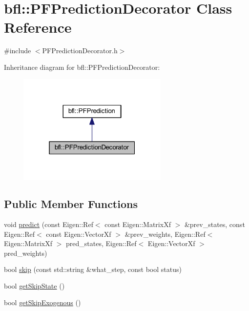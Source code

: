 \hypertarget{classbfl_1_1PFPredictionDecorator}{}\section{bfl\+:\+:P\+F\+Prediction\+Decorator Class Reference}
\label{classbfl_1_1PFPredictionDecorator}


{\ttfamily \#include $<$P\+F\+Prediction\+Decorator.\+h$>$}



Inheritance diagram for bfl\+:\+:P\+F\+Prediction\+Decorator\+:
\nopagebreak
\begin{figure}[H]
\begin{center}
\leavevmode
\includegraphics[width=211pt]{classbfl_1_1PFPredictionDecorator__inherit__graph}
\end{center}
\end{figure}
\subsection*{Public Member Functions}
\begin{DoxyCompactItemize}
\item 
void \mbox{\hyperlink{classbfl_1_1PFPrediction_a54986f12509d3d997232c4e926420c90}{predict}} (const Eigen\+::\+Ref$<$ const Eigen\+::\+Matrix\+Xf $>$ \&prev\+\_\+states, const Eigen\+::\+Ref$<$ const Eigen\+::\+Vector\+Xf $>$ \&prev\+\_\+weights, Eigen\+::\+Ref$<$ Eigen\+::\+Matrix\+Xf $>$ pred\+\_\+states, Eigen\+::\+Ref$<$ Eigen\+::\+Vector\+Xf $>$ pred\+\_\+weights)
\item 
bool \mbox{\hyperlink{classbfl_1_1PFPrediction_a364cc35a151e5298c4024d681f3e04d9}{skip}} (const std\+::string \&what\+\_\+step, const bool status)
\item 
bool \mbox{\hyperlink{classbfl_1_1PFPrediction_a323ca5612dd7ad924fd448a629359ad2}{get\+Skip\+State}} ()
\item 
bool \mbox{\hyperlink{classbfl_1_1PFPrediction_a432b8e84dbf00432158aa82312386d63}{get\+Skip\+Exogenous}} ()
\end{DoxyCompactItemize}
